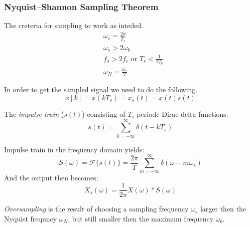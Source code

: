 \documentclass{article}
\begin{document}
\subsubsection{Nyquist–Shannon Sampling Theorem}
The creteria for sampling to work as inteded.
\begin{align*}
    &\omega_s =\frac{2\pi}{T_s} \\
    &\omega_s > 2\omega_b \\
    &f_s > 2f_c \text{ or } T_s < \frac{1}{2f_b} \\
    &\omega_N = \frac{\omega_s}{2}
\end{align*}


In order to get the sampled signal we need to do the following.
\begin{equation*}
    x[k]=x(kT_s)=x_s(t)=x(t)s(t)
\end{equation*}

The \textit{impulse train} ($s(t)$) consisting of $T_s$-periodc Dirac delta functions.
\begin{equation*}
    s(t) = \sum_{k=-\infty}^{\infty} \delta(t-kT_s)
\end{equation*}

Impulse train in the frequency domain yields:
\begin{equation*}
    S(\omega) = \mathcal{F}\{s(t)\} = \frac{2\pi}{T} \sum_{m=-\infty}^{\infty} \delta(\omega-m\omega_s)
\end{equation*}
And the output then becomes:
\begin{equation*}
    X_s(\omega) = \frac{1}{2\pi}X(\omega) * S(\omega)
\end{equation*}

\textit{Oversampling} is the result of choosing a sampling frequency $\omega_s$ larger then the Nyquist frequncy $\omega_N$,
but still smaller then the maximum frequency $\omega_b$.
\end{document}
